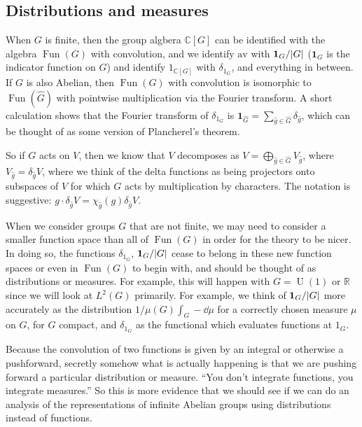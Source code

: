 \documentclass[11pt,leqno]{article}
\theoremstyle{plain}
\theoremstyle{definition}
\numberwithin{equation}{section}
\numberwithin{lem}{section}
\DeclareMathOperator{\Fun}{Fun}
\DeclareMathOperator{\U}{U}
\newcommand{\av}{\mathrm{av}}
\begin{document}
\subsection{Distributions and measures}
When $G$ is finite, then the group algbera $\mathbb C[G]$ can be identified with the algebra $\Fun(G)$ with convolution, and we identify $\av$ with $\mathbf{1}_G/\abs{G}$ ($\mathbf{1}_G$ is the indicator function on $G$) and identify $1_{\mathbb C[G]}$ with $\delta_{1_{G}}$, and everything in between. If $G$ is also Abelian, then $\Fun(G)$ with convolution is isomorphic to $\Fun(\widehat G)$ with pointwise multiplication via the Fourier transform. A short calculation shows that the Fourier transform of $\delta_{1_G}$ is $\mathbf{1}_{\widehat G} = \sum_{\hat g\in\widehat G}\delta_{\hat g}$, which can be thought of as some version of Plancherel's theorem.

So if $G$ acts on $V$, then we know that $V$ decomposes as $V = \bigoplus_{\hat g\in \widehat G}V_{\hat g}$, where $V_{\hat g} = \delta_{\hat g}V$, where we think of the delta functions as being projectors onto subspaces of $V$ for which $G$ acts by multiplication by characters. The notation is suggestive: $g\cdot \delta_{\hat g}V = \chi_{\hat g}(g)\delta_{\hat g}V$.

When we consider groups $G$ that are not finite, we may need to consider a smaller function space than all of $\Fun(G)$ in order for the theory to be nicer. In doing so, the functions $\delta_{1_G}$, $\mathbf{1}_G/\abs{G}$ cease to belong in these new function spaces or even in $\Fun(G)$ to begin with, and should be thought of as distributions or measures. For example, this will happen with $G = \U(1)$ or $\mathbb R$ since we will look at $L^2(G)$ primarily. For example, we think of $\mathbf{1}_G/\abs{G}$ more accurately as the distribution $1/\mu(G)\int_G-\dd\mu$ for a correctly chosen measure $\mu$ on $G$, for $G$ compact, and $\delta_{1_G}$ as the functional which evaluates functions at $1_G$.

Because the convolution of two functions is given by an integral or otherwise a pushforward, secretly somehow what is actually happening is that we are pushing forward a particular distribution or measure. ``You don't integrate functions, you integrate measures.'' So this is more evidence that we should see if we can do an analysis of the representations of infinite Abelian groups using distributions instead of functions.

\end{document}
